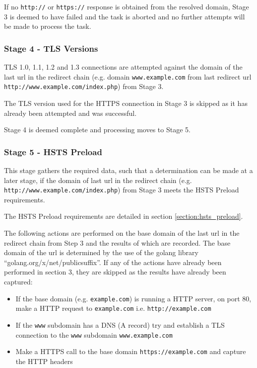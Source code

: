 \documentclass{mscreport}
\begin{document}
\vspace{0.3cm} \noindent
If no \texttt{http://} or \texttt{https://} response is obtained from the resolved domain, Stage 3 is deemed to have failed and the task is aborted and no further attempts will be made to process the task.

\subsubsection{Stage 4 - TLS Versions}

TLS 1.0, 1.1, 1.2 and 1.3 connections are attempted against the domain of the last url in the redirect chain (e.g. domain \texttt{www.example.com} from last redirect url \newline \texttt{http://www.example.com/index.php}) from Stage 3.

\vspace{0.3cm} \noindent
The TLS version used for the HTTPS connection in Stage 3 is skipped as it has already been attempted and was successful.


\vspace{0.3cm} \noindent
Stage 4 is deemed complete and processing moves to Stage 5.

\subsubsection{Stage 5 - HSTS Preload}
\label{subsection:stage_5_hsts}

This stage gathers the required data, such that a determination can be made at a later stage, if the domain of last url in the redirect chain (e.g. \texttt{http://www.example.com/index.php}) from Stage 3 meets the HSTS Preload requirements.

\vspace{0.3cm} \noindent
The HSTS Preload requirements are detailed in section \ref{section:hsts_preload}.

\vspace{0.3cm} \noindent
The following actions are performed on the base domain of the last url in the redirect chain from Step 3 and the results of which are recorded. The base domain of the url is determined by the use of the golang library ``golang.org/x/net/publicsuffix''. If any of the actions have already been performed in section 3, they are skipped as the results have already been captured:

\begin{itemize}
	\setlength\itemsep{0.1em}
    \item If the base domain (e.g. \texttt{example.com}) is running a HTTP server, on port 80, make a HTTP request to \texttt{example.com} i.e. \texttt{http://example.com}
    \item If the \texttt{www} subdomain has a DNS (A record) try and establish a TLS connection to the \texttt{www} subdomain \texttt{www.example.com}
    \item Make a HTTPS call to the base domain \texttt{https://example.com} and capture the HTTP headers
\end{itemize}
\end{document}
